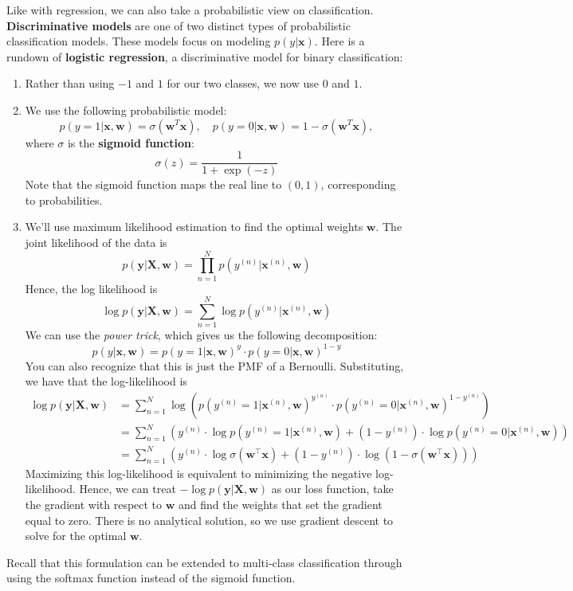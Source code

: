 \documentclass[11pt, letterpaper]{article}
\theoremstyle{definition}
\theoremstyle{plain}
\begin{document}
Like with regression, we can also take a probabilistic view on classification. \textbf{Discriminative models} are one of two distinct types of probabilistic classification models. These models focus on modeling $p(y | \bm x)$. Here is a rundown of \textbf{logistic regression}, a discriminative model for binary classification:
\begin{enumerate}
    \item Rather than using $-1$ and $1$ for our two classes, we now use $0$ and $1$. 
    
    \item We use the following probabilistic model:
    \[p(y = 1 | \bm{x}, \bm w) = \sigma(\bm{w}^{T}\bm{x}), \quad p(y = 0 | \bm{x}, \bm w) = 1 - \sigma(\bm{w}^{T}\bm{x} ),\]
    where $\sigma$ is the \textbf{sigmoid function}:
    \[\sigma(z) = \frac{1}{1 + \exp(-z)}\]
    Note that the sigmoid function maps the real line to $(0, 1)$, corresponding to probabilities.

    \item We'll use maximum likelihood estimation to find the optimal weights $\bm{w}$. The joint likelihood of the data is
    \[p(\bm y | \bm X, \bm w) = \prod_{n=1}^{N} p(y^{(n)}|\bm x^{(n)}, \bm w)\]
    Hence, the log likelihood is 
    \[\log p(\bm y | \bm X, \bm w) = \sum_{n=1}^{N} \log p(y^{(n)}|\bm x^{(n)}, \bm w)\]
    We can use the \textit{power trick}, which gives us the following decomposition:
    \[p(y |\bm x, \bm w) = p(y =1|\bm x, \bm w)^y \cdot p(y =0|\bm x, \bm w)^{1-y}\]
    You can also recognize that this is just the PMF of a Bernoulli. Substituting, we have that the log-likelihood is
    \begin{align*}
        \log p(\bm y | \bm X, \bm w) &= \sum_{n=1}^{N} \log\left(p(y^{(n)} =1|\bm x^{(n)}, \bm w)^{y^{(n)}} \cdot p(y^{(n)} =0|\bm x^{(n)}, \bm w)^{1-y^{(n)}} \right) \\
            &= \sum_{n=1}^{N} \left(y^{(n)} \cdot \log p(y^{(n)} =1|\bm x^{(n)}, \bm w) +  (1-y^{(n)}) \cdot \log p(y^{(n)} =0|\bm x^{(n)}, \bm w)\right) \\
            &= \sum_{n=1}^{N} \left(y^{(n)} \cdot \log \sigma(\bm{w}^\top \bm x)+  (1-y^{(n)}) \cdot \log (1-\sigma(\bm{w}^\top \bm x))\right)
    \end{align*}
    Maximizing this log-likelihood is equivalent to minimizing the negative log-likelihood. Hence, we can treat $-\log p(\bm y | \bm X, \bm w)$ as our loss function, take the gradient with respect to $\bm w$ and find the weights that set the gradient equal to zero. There is no analytical solution, so we use gradient descent to solve for the optimal $\bm w$.
\end{enumerate} 
Recall that this formulation can be extended to multi-class classification through using the softmax function instead of the sigmoid function.
\end{document}
